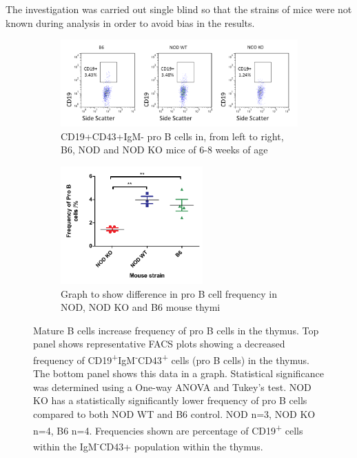 The investigation was carried out single blind so that the strains of mice were not known during analysis in order to avoid bias in the results.

\begin{figure}
	\begin{subfigure}{\textwidth}
	\includegraphics[width=\textwidth]{Figures/MatureBincproB.png}
	\caption{CD19+CD43+IgM- pro B cells in, from left to right, B6, NOD and NOD KO mice of 6-8 weeks of age}
	\end{subfigure}
	\begin{subfigure}{\textwidth}
	\centering
	\includegraphics[width=0.6\textwidth]{Figures/MatureBincproBgraph.pdf}
	\caption{Graph to show difference in pro B cell frequency in NOD, NOD KO and B6 mouse thymi}
	\label{subfig:MatureBincproBgraph}
	\end{subfigure}
\caption{Mature B cells increase frequency of pro B cells in the thymus.
Top panel shows representative FACS plots showing a decreased frequency of CD19\textsuperscript{+}IgM\textsuperscript{-}CD43\textsuperscript{+} cells (pro B cells) in the thymus.
The bottom panel shows this data in a graph.
Statistical significance was determined using a One-way ANOVA and Tukey's test. NOD KO has a statistically significantly lower frequency of pro B cells compared to both NOD WT and B6 control. NOD n=3, NOD KO n=4, B6 n=4. Frequencies shown are percentage of CD19\textsuperscript{+} cells within the IgM\textsuperscript{-}CD43{+} population within the thymus.}
\label{fig:MatureBincProB}
\end{figure}


